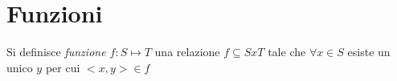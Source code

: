 \chapter{Funzioni}
Si definisce \textit{funzione $f:S \mapsto T$} una relazione $f \subseteq SxT$ tale che $\forall x \in S$
esiste un unico $y$ per cui $<x,y> \in f$
